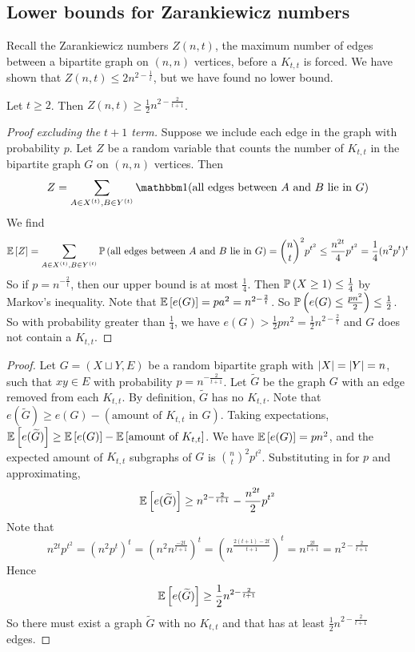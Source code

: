 \subsection{Lower bounds for Zarankiewicz numbers}
Recall the Zarankiewicz numbers \( Z(n,t) \), the maximum number of edges between a bipartite graph on \( (n, n) \) vertices, before a \( K_{t,t} \) is forced.
We have shown that \( Z(n,t) \leq 2n^{2 - \frac 1t} \), but we have found no lower bound.
\begin{theorem}
	Let \( t \geq 2 \).
	Then \( Z(n,t) \geq \frac{1}{2} n^{2 - \frac{2}{t+1}} \).
\end{theorem}
\begin{proof}[Proof excluding the \( t + 1 \) term]
	Suppose we include each edge in the graph with probability \( p \).
	Let \( Z \) be a random variable that counts the number of \( K_{t,t} \) in the bipartite graph \( G \) on \( (n, n) \) vertices.
	Then
	\[ Z = \sum_{A \in X^{(t)}, B \in Y^{(t)}} \mathbbm 1(\text{all edges between \( A \) and \( B \) lie in \( G \)}) \]
	We find
	\[ \mathbb{E}\left[{Z}\right] = \sum_{A \in X^{(t)}, B \in Y^{(t)}} \mathbb{P}\left({\text{all edges between \( A \) and \( B \) lie in \( G \)}}\right) = {\binom n t}^2 p^{t^2} \leq \frac{n^{2t}}{4} p^{t^2} = \frac{1}{4} (n^2 p^t)^t \]
	So if \( p = n^{-\frac{2}{t}} \), then our upper bound is at most \( \frac{1}{4} \).
	Then \( \mathbb{P}\left({X \geq 1}\right) \leq \frac{1}{4} \) by Markov's inequality.
	Note that \( \mathbb{E}\left[{e(G)}\right] = pa^2 = n^{2 - \frac 2 t} \).
	So \( \mathbb{P}\left({e(G) \leq \frac{pn^2}{2}}\right) \leq \frac{1}{2} \).
	So with probability greater than \( \frac 14 \), we have \( e(G) > \frac{1}{2} pn^2 = \frac{1}{2} n^{2 - \frac{2}{t}} \) and \( G \) does not contain a \( K_{t,t} \).
\end{proof}
\begin{proof}
	Let \( G = (X \sqcup Y, E) \) be a random bipartite graph with \( \abs{X} = \abs{Y} = n \), such that \( xy \in E \) with probability \( p = n^{-\frac{2}{t+1}} \).
	Let \( \widetilde G \) be the graph \( G \) with an edge removed from each \( K_{t,t} \).
	By definition, \( \widetilde G \) has no \( K_{t,t} \).
	Note that \( e(\widetilde G) \geq e(G) - (\text{amount of } K_{t,t} \text{ in } G) \).
	Taking expectations, \( \mathbb{E}\left[{e(\widetilde G)}\right] \geq \mathbb{E}\left[{e(G)}\right] - \mathbb{E}\left[{\text{amount of } K_{t,t}}\right] \).
	We have \( \mathbb{E}\left[{e(G)}\right] = pn^2 \), and the expected amount of \( K_{t,t} \) subgraphs of \( G \) is \( {\binom n t}^2 p^{t^2} \).
	Substituting in for \( p \) and approximating,
	\[ \mathbb{E}\left[{e(\widetilde G)}\right] \geq n^{2-\frac{2}{t+1}} - \frac{n^{2t}}{2} p^{t^2} \]
	Note that
	\[ n^{2t} p^{t^2} = (n^2 p^t)^t = (n^2 n^{\frac{-2t}{t+1}})^t = (n^{\frac{2(t+1) - 2t}{t+1}})^t = n^{\frac{2t}{t+1}} = n^{2 - \frac{2}{t+1}} \]
	Hence
	\[ \mathbb{E}\left[{e(\widetilde G)}\right] \geq \frac{1}{2} n^{2 - \frac{2}{t+1}} \]
	So there must exist a graph \( \widetilde G \) with no \( K_{t,t} \) and that has at least \( \frac{1}{2} n^{2 - \frac{2}{t+1}} \) edges.
\end{proof}

